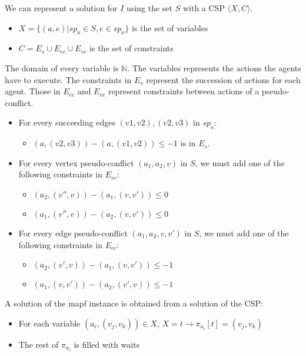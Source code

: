We can represent a solution for $I$ using the set $S$ with a CSP $\langle X,C \rangle.$
\begin{itemize}
  \item $X = \{(a,e) | sp_a \in S, e \in sp_a \}$ is the set of variables
  \item $C = E_s \cup E_{ec} \cup E_{vc}$ is the set of constraints
\end{itemize}
The domain of every variable is $ {\displaystyle \mathbb {N} }$.
The variables represents the actions the agents have to execute.
The constraints in $E_s$ represent the succession of actions for each agent. Those in $E_{ec}$ and $E_{vc}$ represent constraints between actions of a pseudo-conflict.

\begin{itemize}
  \item For every succeeding edges $(v1,v2),(v2,v3)$ in $sp_a$:
  \begin{itemize}
    \item $(a,(v2,v3)) - (a,(v1,v2)) \leq -1$ is in $E_s$.
  \end{itemize}
  \item For every vertex pseudo-conflict $(a_1,a_2,v)$ in $S$, we must add one of the following constraints in $E_{vc}$:
  \begin{itemize}
    \item $(a_2,(v'',v)) - (a_1,(v,v')) \leq 0$
    \item $(a_1,(v'',v)) - (a_2,(v,v')) \leq 0$
  \end{itemize}
  \item For every edge pseudo-conflict $(a_1,a_2,v,v')$ in $S$, we must add one of the following constraints in $E_{ec}$:
  \begin{itemize}
    \item $(a_2,(v',v)) - (a_1,(v,v')) \leq -1$
    \item $(a_1,(v,v')) - (a_2,(v',v)) \leq -1$
  \end{itemize}
\end{itemize}

A solution of the mapf instance is obtained from a solution of the CSP:
\begin{itemize}
  \item For each variable $(a_i,(v_j,v_k)) \in X$, $X=t \rightarrow \pi_{a_i}[t]=(v_j,v_k)$
  \item The rest of $\pi_{a_i}$ is filled with waits 
\end{itemize}
